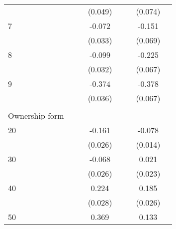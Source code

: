 \begin{longtable}{l*{3}{c}|l*{3}{c}}
	&                     &                     &     (0.049)         &                     &                     &     (0.074)         \\
	7                   &                     &                     &      -0.072\sym{**} &                     &                     &      -0.151\sym{**} \\
	&                     &                     &     (0.033)         &                     &                     &     (0.069)         \\
	8                   &                     &                     &      -0.099\sym{***}&                     &                     &      -0.225\sym{***}\\
	&                     &                     &     (0.032)         &                     &                     &     (0.067)         \\
	9                   &                     &                     &      -0.374\sym{***}&                     &                     &      -0.378\sym{***}\\
	&                     &                     &     (0.036)         &                     &                     &     (0.067)         \\
		&&&&&&&\\
	Ownership form &&&&&&\\
	20                  &                     &                     &      -0.161\sym{***}&                     &                     &      -0.078\sym{***}\\
	&                     &                     &     (0.026)         &                     &                     &     (0.014)         \\
	30                  &                     &                     &      -0.068\sym{***}&                     &                     &       0.021         \\
	&                     &                     &     (0.026)         &                     &                     &     (0.023)         \\
	40                  &                     &                     &       0.224\sym{***}&                     &                     &       0.185\sym{***}\\
	&                     &                     &     (0.028)         &                     &                     &     (0.026)         \\
	50                  &                     &                     &       0.369\sym{***}&                     &                     &       0.133\sym{*}  \\

\end{longtable}
